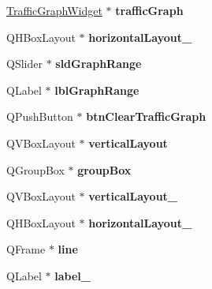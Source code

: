 \begin{DoxyCompactItemize}
\mbox{\hyperlink{class_traffic_graph_widget}{Traffic\+Graph\+Widget}} $\ast$ {\bfseries traffic\+Graph}
\item 
\mbox{\label{class_ui___r_p_c_console_a64779c5af75ec5bd9dd294258b852e8c}} 
Q\+H\+Box\+Layout $\ast$ {\bfseries horizontal\+Layout\+\_}
\item 
\mbox{\label{class_ui___r_p_c_console_a2a83c7698b1b48cc29f66c667ba5b25e}} 
Q\+Slider $\ast$ {\bfseries sld\+Graph\+Range}
\item 
\mbox{\label{class_ui___r_p_c_console_abe120956f48f8022120ff35d78b62107}} 
Q\+Label $\ast$ {\bfseries lbl\+Graph\+Range}
\item 
\mbox{\label{class_ui___r_p_c_console_a79125d9594a8d75a7fdb5ea8cb0796cd}} 
Q\+Push\+Button $\ast$ {\bfseries btn\+Clear\+Traffic\+Graph}
\item 
\mbox{\label{class_ui___r_p_c_console_a779b1484d9d5039d5bcbfbad3580592d}} 
Q\+V\+Box\+Layout $\ast$ {\bfseries vertical\+Layout}
\item 
\mbox{\label{class_ui___r_p_c_console_a24dde61d3cd3038a6e9e9ddf9d2a4ebd}} 
Q\+Group\+Box $\ast$ {\bfseries group\+Box}
\item 
\mbox{\label{class_ui___r_p_c_console_a81682a5e85fd16fb0b0786e085813a88}} 
Q\+V\+Box\+Layout $\ast$ {\bfseries vertical\+Layout\+\_}
\item 
\mbox{\label{class_ui___r_p_c_console_a4141656c58dc0526231a16a7e8506733}} 
Q\+H\+Box\+Layout $\ast$ {\bfseries horizontal\+Layout\+\_}
\item 
\mbox{\label{class_ui___r_p_c_console_a89bc2c534d9dccca28ba7ec10373a209}} 
Q\+Frame $\ast$ {\bfseries line}
\item 
\mbox{\label{class_ui___r_p_c_console_af6669add09e481cf485edd26287af036}} 
Q\+Label $\ast$ {\bfseries label\+\_}
\item 

\end{DoxyCompactItemize}
